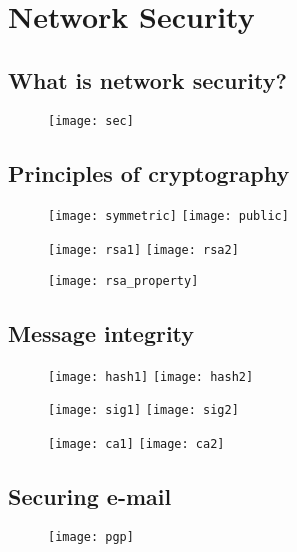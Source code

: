 \section{Network Security}

\subsection{What is network security?}
\begin{figure}[H]
  \centering
  \texttt{[image: sec]}
\end{figure}

\subsection{Principles of cryptography}

\begin{figure}[H]
  \centering
  \texttt{[image: symmetric]}
  \texttt{[image: public]}
\end{figure}

\begin{figure}[H]
  \centering
  \texttt{[image: rsa1]}
  \texttt{[image: rsa2]}
\end{figure}

\begin{figure}[H]
  \centering
  \texttt{[image: rsa\_property]}
\end{figure}

\subsection{Message integrity}

\begin{figure}[H]
  \centering
  \texttt{[image: hash1]}
  \texttt{[image: hash2]}
\end{figure}

\begin{figure}[H]
  \centering
  \texttt{[image: sig1]}
  \texttt{[image: sig2]}
\end{figure}

\begin{figure}[H]
  \centering
  \texttt{[image: ca1]}
  \texttt{[image: ca2]}
\end{figure}

\subsection{Securing e-mail}

\begin{figure}[H]
  \centering
  \texttt{[image: pgp]}
\end{figure}
